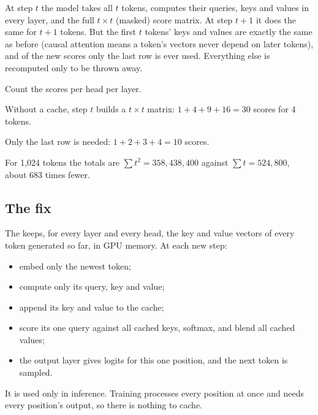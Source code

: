 \begin{result}
At step $t$ the model takes all $t$ tokens, computes their queries, keys and values in every layer, and the full $t \times t$ (masked) score matrix. At step $t + 1$ it does the same for $t + 1$ tokens. But the first $t$ tokens' keys and values are exactly the same as before (causal attention means a token's vectors never depend on later tokens), and of the new scores only the last row is ever used. Everything else is recomputed only to be thrown away.
\end{result}

\begin{example}
Count the scores per head per layer.
\begin{steps}
  \item Without a cache, step $t$ builds a $t \times t$ matrix: $1 + 4 + 9 + 16 = 30$ scores for 4 tokens.
  \item Only the last row is needed: $1 + 2 + 3 + 4 = 10$ scores.
  \item For 1,024 tokens the totals are $\sum t^2 = 358{,}438{,}400$ against $\sum t = 524{,}800$, about 683 times fewer.
\end{steps}
\end{example}

\subsection*{The fix}

\begin{definition}[KV cache]
The  keeps, for every layer and every head, the key and value vectors of every token generated so far, in GPU memory. At each new step:
\begin{itemize}
  \item embed only the newest token;
  \item compute only its query, key and value;
  \item append its key and value to the cache;
  \item score its one query against all cached keys, softmax, and blend all cached values;
  \item the output layer gives logits for this one position, and the next token is sampled.
\end{itemize}
It is used only in inference. Training processes every position at once and needs every position's output, so there is nothing to cache.
\end{definition}

